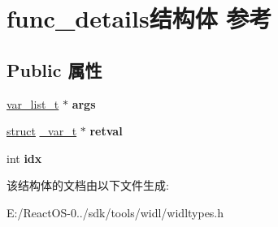 \hypertarget{structfunc__details}{}\section{func\+\_\+details结构体 参考}
\label{structfunc__details}
\subsection*{Public 属性}
\begin{DoxyCompactItemize}
\item 
\mbox{\label{structfunc__details_a2f6138e63cad02ee1d0324fdf9f81364}} 
\hyperlink{classlist}{var\+\_\+list\+\_\+t} $\ast$ {\bfseries args}
\item 
\mbox{\label{structfunc__details_abe8d63b6150857cba2e7912afc0f3513}} 
\hyperlink{interfacestruct}{struct} \hyperlink{struct__var__t}{\+\_\+var\+\_\+t} $\ast$ {\bfseries retval}
\item 
\mbox{\label{structfunc__details_a24c3cc6c2660d308f3a6be12c1af9d32}} 
int {\bfseries idx}
\end{DoxyCompactItemize}


该结构体的文档由以下文件生成\+:\begin{DoxyCompactItemize}
\item 
E\+:/\+React\+O\+S-\/0../sdk/tools/widl/widltypes.\+h\end{DoxyCompactItemize}

